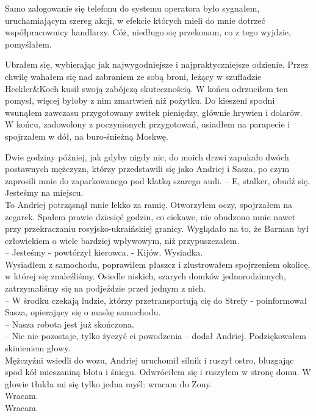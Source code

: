 \documentclass[../MAIN.tex]{subfiles}
\begin{document}
Samo zalogowanie się telefonu do systemu operatora było
sygnałem, uruchamiającym szereg akcji, w efekcie których mieli
do mnie dotrzeć współpracownicy handlarzy. Cóż, niedługo się
przekonam, co z tego wyjdzie, pomyślałem.

Ubrałem się, wybierając jak najwygodniejsze i
najpraktyczniejsze odzienie. Przez chwilę wahałem się nad
zabraniem ze sobą broni, leżący w szufladzie Heckler{\&}Koch
kusił swoją zabójczą skutecznością. W końcu odrzuciłem ten
pomysł, więcej byłoby z nim zmartwień niż pożytku. Do kieszeni
spodni wsunąłem zawczasu przygotowany zwitek pieniędzy, głównie
hrywien i dolarów. W końcu, zadowolony z poczynionych
przygotowań, usiadłem na parapecie i spojrzałem w dół, na
buro-śnieżną Moskwę.

Dwie godziny później, jak gdyby nigdy nic, do moich drzwi
zapukało dwóch postawnych mężczyzn, którzy przedstawili się
jako Andriej i Sasza, po czym zaprosili mnie do zaparkowanego
pod klatką szarego audi.
%
%
-- E, stalker, obudź się. Jesteśmy na miejscu.
\\
To Andriej potrząsnął mnie lekko za ramię. Otworzyłem oczy,
spojrzałem na zegarek. Spałem prawie dziesięć godzin, co
ciekawe, nie obudzono mnie nawet przy przekraczaniu
rosyjsko-ukraińskiej granicy. Wyglądało na to, że Barman był
człowiekiem o wiele bardziej wpływowym, niż przypuszczałem.
\\
-- Jesteśmy - powtórzył kierowca. - Kijów. Wysiadka.
\\
Wysiadłem z samochodu, poprawiłem płaszcz i zlustrowałem
spojrzeniem okolicę, w której się znaleźliśmy. Osiedle niskich,
szarych domków jednorodzinnych, zatrzymaliśmy się na podjeździe
przed jednym z nich.
\\
-- W środku czekają ludzie, którzy przetransportują cię do
Strefy - poinformował Sasza, opierający się o maskę samochodu.
\\
-- Nasza robota jest już skończona.
\\
-- Nic nie pozostaje, tylko życzyć ci powodzenia -- dodał
Andriej.
Podziękowałem skinieniem głowy.
\\
Mężczyźni wsiedli do wozu,
Andriej uruchomił silnik i ruszył ostro, bluzgając spod kół
mieszaniną błota i śniegu. Odwróciłem się i ruszyłem w stronę
domu.
W głowie tłukła mi się tylko jedna myśl: wracam do Zony.\\
Wracam.\\
Wracam.
\end{document}
